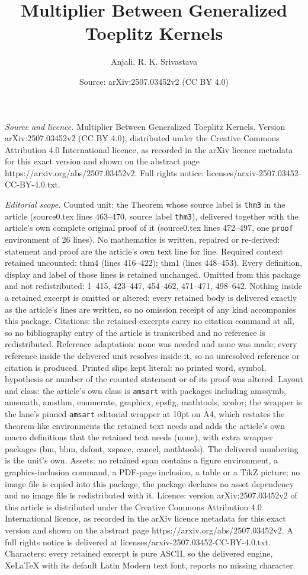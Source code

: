 \documentclass[10pt,a4paper]{amsart}
\title[Multiplier Between Generalized Toeplitz Kernels]{Multiplier Between Generalized Toeplitz Kernels}
\author{Anjali, R. K. Srivastava}
\date{Source: arXiv:2507.03452v2 (CC BY 4.0)}
\begin{document}
\maketitle

\noindent\emph{Source and licence.} Multiplier Between Generalized Toeplitz Kernels. Version arXiv:2507.03452v2 (CC BY 4.0), distributed under the Creative Commons Attribution 4.0 International licence, as recorded in the arXiv licence metadata for this exact version and shown on the abstract page https://arxiv.org/abs/2507.03452v2. Full rights notice: licenses/arxiv-2507.03452-CC-BY-4.0.txt.\par\smallskip

\noindent\textit{Editorial scope.} Counted unit: the Theorem whose source label is \texttt{thm3} in the article (source0.tex lines 463--470, source label \texttt{thm3}), delivered together with the article's own complete original proof of it (source0.tex lines 472--497, one \texttt{proof} environment of 26 lines). No mathematics is written, repaired or re-derived: statement and proof are the article's own text line for line. Required context retained uncounted: thm4 (lines 416--422); thm1 (lines 448--453). Every definition, display and label of those lines is retained unchanged. Omitted from this package and not redistributed: 1--415, 423--447, 454--462, 471--471, 498--642. Nothing inside a retained excerpt is omitted or altered: every retained body is delivered exactly as the article's lines are written, so no omission receipt of any kind accompanies this package. Citations: the retained excerpts carry no citation command at all, so no bibliography entry of the article is transcribed and no reference is redistributed. Reference adaptation: none was needed and none was made; every reference inside the delivered unit resolves inside it, so no unresolved reference or citation is produced. Printed slips kept literal: no printed word, symbol, hypothesis or number of the counted statement or of its proof was altered. Layout and class: the article's own class is \texttt{amsart} with packages including amssymb, amsmath, amsthm, enumerate, graphicx, epsfig, mathtools, xcolor; the wrapper is the lane's pinned \texttt{amsart} editorial wrapper at 10pt on A4, which restates the theorem-like environments the retained text needs and adds the article's own macro definitions that the retained text needs (none), with extra wrapper packages (bm, bbm, dsfont, xspace, cancel, mathtools). The delivered numbering is the unit's own. Assets: no retained span contains a figure environment, a graphics-inclusion command, a PDF-page inclusion, a table or a TikZ picture; no image file is copied into this package, the package declares no asset dependency and no image file is redistributed with it. Licence: version arXiv:2507.03452v2 of this article is distributed under the Creative Commons Attribution 4.0 International licence, as recorded in the arXiv licence metadata for this exact version and shown on the abstract page https://arxiv.org/abs/2507.03452v2. A full rights notice is delivered at licenses/arxiv-2507.03452-CC-BY-4.0.txt. Characters: every retained excerpt is pure ASCII, so the delivered engine, XeLaTeX with its default Latin Modern text font, reports no missing character.
\end{document}
